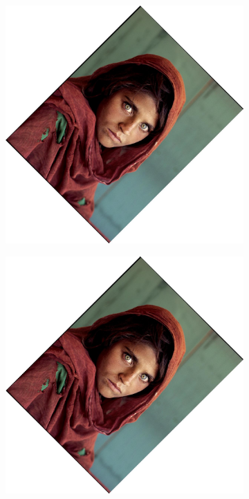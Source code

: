 \documentclass{article}
\begin{document}
\begin{figure}[H]
    \centering
    \begin{subfigure}{.3\textwidth}
        \centering
        \includegraphics[scale=0.04]{q1/output/similar_1_0.5_2.jpg}
        \subcaption{}
    \end{subfigure}
    \begin{subfigure}{.3\textwidth}
        \centering
        \includegraphics[scale=0.04]{q1/output/similar_1_1_2.jpg}

\end{subfigure}
\end{figure}
\end{document}

